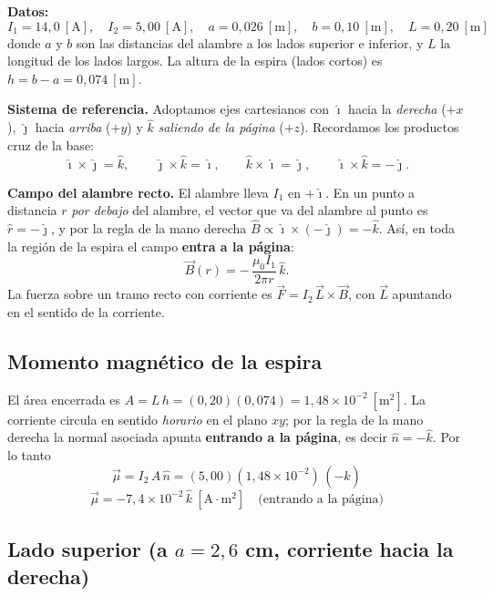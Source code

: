 \documentclass[12pt,letterpaper]{article}
\begin{document}
\medskip

\noindent\textbf{Datos:}
\[
    I_1 = 14{,}0\ [\text{A}],\quad I_2 = 5{,}00\ [\text{A}],\quad
    a = 0{,}026\ [\text{m}],\quad b = 0{,}10\ [\text{m}],\quad L = 0{,}20\ [\text{m}]
\]
donde $a$ y $b$ son las distancias del alambre a los lados superior e inferior, y $L$ la
longitud de los lados largos. La altura de la espira (lados cortos) es
$h = b - a = 0{,}074\ [\text{m}]$.

\medskip

\noindent\textbf{Sistema de referencia.} Adoptamos ejes cartesianos con
$\hat{\imath}$ hacia la \emph{derecha} ($+x$), $\hat{\jmath}$ hacia \emph{arriba} ($+y$) y
$\hat{k}$ \emph{saliendo de la p\'agina} ($+z$). Recordamos los productos cruz de la base:
\[
    \hat{\imath}\times\hat{\jmath}=\hat{k},\qquad
    \hat{\jmath}\times\hat{k}=\hat{\imath},\qquad
    \hat{k}\times\hat{\imath}=\hat{\jmath},\qquad
    \hat{\imath}\times\hat{k}=-\hat{\jmath}.
\]

\medskip

\noindent\textbf{Campo del alambre recto.} El alambre lleva $I_1$ en $+\hat{\imath}$. En un punto
a distancia $r$ \emph{por debajo} del alambre, el vector que va del alambre al punto es
$\hat{r}=-\hat{\jmath}$, y por la regla de la mano derecha
$\hat{B}\propto\hat{\imath}\times(-\hat{\jmath})=-\hat{k}$. As\'i, en toda la regi\'on de la espira
el campo \textbf{entra a la p\'agina}:
\[
    \vec{B}(r) = -\,\frac{\mu_0 I_1}{2\pi r}\,\hat{k}.
\]
La fuerza sobre un tramo recto con corriente es $\vec{F} = I_2\,\vec{L}\times\vec{B}$, con
$\vec{L}$ apuntando en el sentido de la corriente.

\subsection*{Momento magn\'etico de la espira}

El \'area encerrada es $A = L\,h = (0{,}20)(0{,}074) = 1{,}48\times10^{-2}\ [\text{m}^2]$.
La corriente circula en sentido \emph{horario} en el plano $xy$; por la regla de la mano derecha
la normal asociada apunta \textbf{entrando a la p\'agina}, es decir $\hat{n}=-\hat{k}$. Por lo tanto
\[
    \vec{\mu} = I_2\,A\,\hat{n} = (5{,}00)(1{,}48\times10^{-2})\,(-\hat{k})
\]
\[
    \boxed{\vec{\mu} = -7{,}4\times10^{-2}\,\hat{k}\ [\text{A}\cdot\text{m}^2]\quad\text{(entrando a la p\'agina)}}
\]

\subsection*{Lado superior (a $a=2{,}6$ cm, corriente hacia la derecha)}
\end{document}
